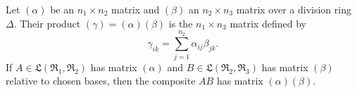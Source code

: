 Let $(\alpha)$ be an $n_1 \times n_2$ matrix and $(\beta)$ an $n_2 \times n_3$ matrix over a division ring $\Delta$. Their product $(\gamma) = (\alpha)(\beta)$ is the $n_1 \times n_3$ matrix defined by
$$\gamma_{ik} = \sum_{j=1}^{n_2} \alpha_{ij} \beta_{jk}.$$
If $A \in \mathfrak{L}(\mathfrak{R}_1, \mathfrak{R}_2)$ has matrix $(\alpha)$ and $B \in \mathfrak{L}(\mathfrak{R}_2, \mathfrak{R}_3)$ has matrix $(\beta)$ relative to chosen bases, then the composite $AB$ has matrix $(\alpha)(\beta)$.
